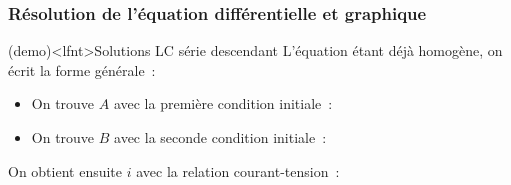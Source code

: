 \documentclass[../../main/main.tex]{subfiles}
\begin{document}
\subsubsection{Résolution de l'équation différentielle et graphique}
\begin{tcb}[label=demo:rcsolu](demo)<lfnt>{Solutions LC série descendant}
	L'équation étant déjà homogène, on écrit la forme générale~:
	\psw{
		\[
			u_C(t) = A\cos(\w_0 t) + B\sin(\w_0 t)
		\]
	}
	\vspace{-15pt}
	\begin{itemize}
		\item On trouve $A$ avec la première condition initiale~:
		      \psw{
			      \[
				      u_C(0) = A\cos(0) + B\sin(0) = A
				      \qet
				      u_C(0) = E
				      \quad \Ra \boxed{A = E}
			      \]
		      }
		      \vspace{-15pt}
		\item On trouve $B$ avec la seconde condition initiale~:
		      \vspace{-15pt}
	\end{itemize}
	On obtient ensuite $i$ avec la relation courant-tension~:
	\psw{
		\[
			i(t) = C \dv{u_c}{t} = -CE \w_0 \sin(\w_0t)
		\]
	}
	\vspace{-15pt}
\end{tcb}
\end{document}
